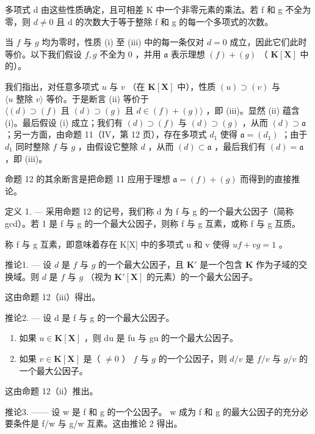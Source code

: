 多项式 d 由这些性质确定，且可相差 K 中一个非零元素的乘法。若 f 和 g 不全为零，则 \(d \neq 0\) 且 d 的次数大于等于整除 f 和 g 的每一个多项式的次数。

当 \(f\) 与 \(g\) 均为零时，性质 (i) 至 (iii) 中的每一条仅对 \(d = 0\) 成立，因此它们此时等价。以下我们假设 \(f, g\) 不全为 0 ，并用 \(\mathfrak{a}\) 表示理想 \((f) + (g)\) （ \(\mathbf{K}[\mathbf{X}]\) 中的）。

我们指出，对任意多项式 \(u\) 与 \(v\) （在 \(\mathbf{K}[\mathbf{X}]\) 中），性质 \((u) \supset (v)\) 与 \(\langle u \text{ 整除 } v \rangle\) 等价。于是断言 (ii) 等价于 \(\langle (d) \supset (f) \text{ 且 } (d) \supset (g) \text{ 且 } d \in (f) + (g) \rangle\) ，即 (iii)。显然 (ii) 蕴含 (i)。最后假设 (i) 成立；我们有 \((d) \supset (f)\) 与 \((d) \supset (g)\) ，从而 \((d) \supset \mathfrak{a}\) ；另一方面，由命题 11（IV，第 12 页），存在多项式 \(d_1\) 使得 \(\mathfrak{a} = (d_1)\) ；由于 \(d_1\) 同时整除 \(f\) 与 \(g\) ，由假设它整除 \(d\) ，从而 \((d) \subset \mathfrak{a}\) ，最后我们有 \((d) = \mathfrak{a}\) ，即 (iii)。

命题 12 的其余断言是把命题 11 应用于理想 \(\mathfrak{a} = (f) + (g)\) 而得到的直接推论。

定义 1. --- 采用命题 12 的记号，我们称 d 为 f 与 g 的一个最大公因子（简称 gcd）。若 1 是 f 与 g 的一个最大公因子，则称 f 与 g 互素，或称 f 与 g 互质。

称 f 与 g 互素，即意味着存在 K{[}X{]} 中的多项式 u 和 v 使得 \(uf + vg = 1\) 。

推论1. — 设 \(d\) 是 \(f\) 与 \(g\) 的一个最大公因子，且 \(\mathbf{K}'\) 是一个包含 \(\mathbf{K}\) 作为子域的交换域。则 \(d\) 是 \(f\) 与 \(g\) （视为 \(\mathbf{K}'[\mathbf{X}]\) 的元素）的一个最大公因子。

这由命题 12（iii）得出。

推论2. --- 设 d 是 f 与 g 的一个最大公因子。

\begin{enumerate}
\def\labelenumi{(\roman{enumi})}
\item
  如果 \(u \in \mathbf{K}[\mathbf{X}]\) ，则 du 是 fu 与 gu 的一个最大公因子。
\item
  如果 \(v \in \mathbf{K}[\mathbf{X}]\) 是（ \(\neq 0\) ） \(f\) 与 \(g\) 的一个公因子，则 \(d / v\) 是 \(f / v\) 与 \(g / v\) 的一个最大公因子。
\end{enumerate}

这由命题 12（ii）推出。

推论3. —— 设 w 是 f 和 g 的一个公因子。 w 成为 f 和 g 的最大公因子的充分必要条件是 f/w 与 g/w 互素。这由推论 2 得出。

